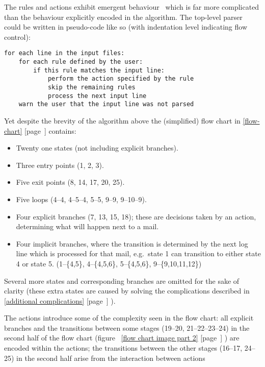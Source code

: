 \documentclass[a4paper,12pt,draft]{article}
\newcommand{\refwithpage}[1]{%
    \empty{}\ref{#1} [page~\pageref{#1}]%
}
\newcommand{\sectionref}[1]{%
    \textsection{}\refwithpage{#1}%
}
\begin{document}
\label{Emergent behaviour}

The rules and actions exhibit emergent behaviour~\cite{Wikipedia-Emergence}
which is far more complicated than the behaviour explicitly encoded in the
algorithm.  The top-level parser could be written in pseudo-code like so
(with indentation level indicating flow control):

\begin{verbatim}
for each line in the input files:
    for each rule defined by the user:
        if this rule matches the input line:
            perform the action specified by the rule
            skip the remaining rules
            process the next input line
    warn the user that the input line was not parsed
\end{verbatim}

Yet despite the brevity of the algorithm above the (simplified) flow chart
in \sectionref{flow-chart} contains:

\begin{itemize}

    \item Twenty one states (not including explicit branches).

    \item Three entry points (1, 2, 3).

    \item Five exit points (8, 14, 17, 20, 25).

    \item Five loops (4--4, 4--5--4, 5--5, 9--9, 9--10--9).

    \item Four explicit branches (7, 13, 15, 18); these are decisions taken
        by an action, determining what will happen next to a mail.

    \item Four implicit branches, where the transition is determined by the
        next log line which is processed for that mail, e.g.\ state 1 can
        transition to either state 4 or state 5.  (1--\{4,5\},
        4--\{4,5,6\}, 5--\{4,5,6\}, 9--\{9,10,11,12\})

\end{itemize}

Several more states and corresponding branches are omitted for the sake of
clarity (these extra states are caused by solving the complications
described in \sectionref{additional complications}).

The actions introduce some of the complexity seen in the flow chart: all
explicit branches and the transitions between some stages (19--20,
21--22--23--24) in the second half of the flow chart
(figure~\refwithpage{flow chart image part 2}) are encoded within the
actions; the transitions between the other stages (16--17, 24--25) in the
second half arise from the interaction between actions
\end{document}
